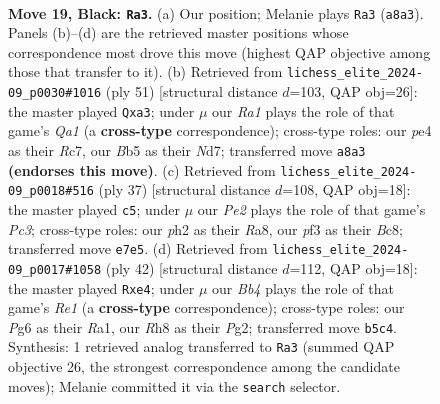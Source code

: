 \documentclass[11pt]{article}
\begin{document}
\begin{figure}[p]
\label{fig:thought-m35}
\end{figure}

\clearpage

\begin{figure}[p]\centering
\begin{subfigure}{0.46\textwidth}\centering
\resizebox{\linewidth}{!}{%
\newchessgame
\chessboard[
  setfen={r3kb1r/1p2pp1n/1B1p2p1/1b5p/3PP3/1P3P2/P4QPP/2K1R2R b kq - 0 19},
  showmover=false,
  pgfstyle=straightmove, color=movearrow, markmove={a8-a3}
]}
\caption{}
\end{subfigure}\hfill
\begin{subfigure}{0.46\textwidth}\centering
\resizebox{\linewidth}{!}{%
\newchessgame
\chessboard[
  setfen={q5k1/2rnpp1p/3p2p1/1p6/2bBP3/P1P2P2/2PR1QPP/3R2K1 b - - 2 26},
  showmover=false,
  pgfstyle=straightmove, color=movearrow, markmove={a8-a3}
]}
\caption{}
\end{subfigure}
\\[4pt]
\begin{subfigure}{0.46\textwidth}\centering
\resizebox{\linewidth}{!}{%
\newchessgame
\chessboard[
  setfen={r1b1r1k1/p4pbp/1pp3p1/8/2PpP3/1P1N2P1/P4PBP/R2R2K1 b - - 1 19},
  showmover=false,
  pgfstyle=straightmove, color=movearrow, markmove={c6-c5}
]}
\caption{}
\end{subfigure}\hfill
\begin{subfigure}{0.46\textwidth}\centering
\resizebox{\linewidth}{!}{%
\newchessgame
\chessboard[
  setfen={r4rk1/pp1qbpp1/2p1p2p/P7/3Pp3/1QP4P/1P3PPB/R3R1K1 w - - 0 22},
  showmover=false,
  pgfstyle=straightmove, color=movearrow, markmove={e1-e4}
]}
\caption{}
\end{subfigure}
\caption{\textbf{Move 19, Black: \texttt{Ra3}.} (a) Our position; Melanie plays \texttt{Ra3} (\texttt{a8a3}). Panels (b)--(d) are the retrieved master positions whose correspondence most drove this move (highest QAP objective among those that transfer to it). (b) Retrieved from \texttt{lichess\_elite\_2024-09\_p0030\#1016} (ply 51) [structural distance $d$=103, QAP obj=26]: the master played \texttt{Qxa3}; under $\mu$ our \emph{Ra1} plays the role of that game's \emph{Qa1} (a \textbf{cross-type} correspondence); cross-type roles: our \emph{p}e4 as their \emph{R}c7, our \emph{B}b5 as their \emph{N}d7; transferred move \texttt{a8a3} \textbf{(endorses this move)}. (c) Retrieved from \texttt{lichess\_elite\_2024-09\_p0018\#516} (ply 37) [structural distance $d$=108, QAP obj=18]: the master played \texttt{c5}; under $\mu$ our \emph{Pe2} plays the role of that game's \emph{Pc3}; cross-type roles: our \emph{p}h2 as their \emph{R}a8, our \emph{p}f3 as their \emph{B}c8; transferred move \texttt{e7e5}. (d) Retrieved from \texttt{lichess\_elite\_2024-09\_p0017\#1058} (ply 42) [structural distance $d$=112, QAP obj=18]: the master played \texttt{Rxe4}; under $\mu$ our \emph{Bb4} plays the role of that game's \emph{Re1} (a \textbf{cross-type} correspondence); cross-type roles: our \emph{P}g6 as their \emph{R}a1, our \emph{R}h8 as their \emph{P}g2; transferred move \texttt{b5c4}. Synthesis: 1 retrieved analog transferred to \texttt{Ra3} (summed QAP objective 26, the strongest correspondence among the candidate moves); Melanie committed it via the \texttt{search} selector.}

\end{figure}
\end{document}
